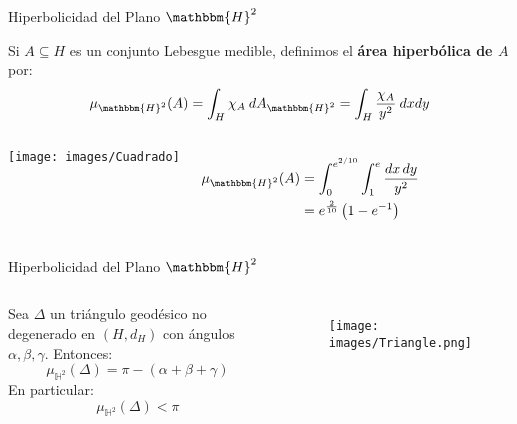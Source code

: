 \documentclass[xcolor=dvipsnames,aspectratio=159]{beamer}
\theoremstyle{largebreak}
\newcommand{\bbm}[1]{\ensuremath{\mathbbm{#1}}}
\begin{document}
\begin{frame}{Hiperbolicidad del Plano $\bbm{H}^2$}
    \begin{mydef}
        Si $A\subseteq H$ es un conjunto Lebesgue medible, definimos el \textbf{área hiperbólica de $A$} por:
        \begin{equation*}
            \mu_{\bbm{H}^2}(A)=\int_{H}\chi_A\:dA_{\bbm{H}^2}=\int_{H}\frac{\chi_A}{y^2}\:dxdy
        \end{equation*}
    \end{mydef}

    \pause
    
    \begin{exa}
        \begin{columns}
            \centering \texttt{[image: images/Cuadrado]}
        
            \begin{equation*}
                \begin{split}
                    \mu_{\bbm{H}^2}(A) &= \int_{0}^{e^{2/10}} \int_{1}^{e} \frac{dx\,dy}{y^2} \\ 
                    &= e^{\frac{2}{10}} \left(1 - e^{-1} \right)
                \end{split}
            \end{equation*}
        \end{columns}
    \end{exa}    
\end{frame}

\begin{frame}{Hiperbolicidad del Plano $\bbm{H}^2$}
  \begin{columns}
    \begin{theor}
      Sea $\Delta$ un triángulo geodésico no degenerado en $(H,d_H)$ con ángulos $\alpha,\beta,\gamma$. Entonces:
      \begin{equation*}
        \mu_{\mathbb{H}^2}(\Delta) = \pi - (\alpha + \beta + \gamma)
      \end{equation*}
      \pause
      En particular:
      \begin{equation*}
        \mu_{\mathbb{H}^2}(\Delta) < \pi
      \end{equation*}
    \end{theor}

    \begin{figure}
      \centering
      \texttt{[image: images/Triangle.png]}
    \end{figure}
  \end{columns}
\end{frame}
\end{document}

